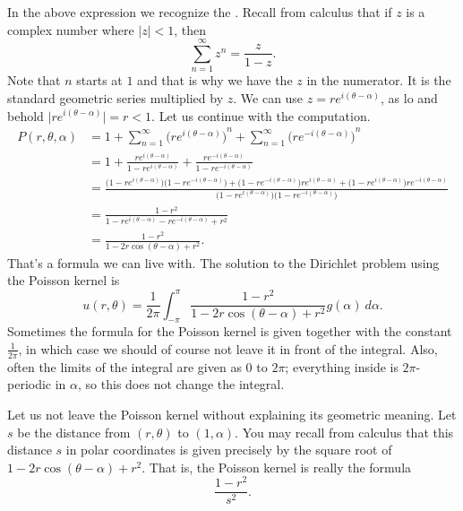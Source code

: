In the above expression we recognize the
\emph{}.
Recall from calculus that if $z$ is a complex number where $\lvert z \rvert < 1$, then
\begin{equation*}
\sum_{n=1}^\infty z^n = \frac{z}{1-z} .
\end{equation*}
Note that $n$ starts at $1$ and that is why we have the $z$ in the numerator.
It is the standard geometric series multiplied by $z$.
We can use $z = re^{i(\theta-\alpha)}$, as
lo and behold $\lvert re^{i(\theta-\alpha)} \rvert = r < 1$.
Let us
continue with the computation.
\begin{equation*}
\begin{split}
P(r,\theta,\alpha)
& =
1
+
\sum_{n=1}^\infty
{\bigl(
re^{i(\theta-\alpha)}\bigr)}^{n}
+
\sum_{n=1}^\infty
{\bigl(
re^{-i(\theta-\alpha)}\bigr)}^{n}
\\
& =
1
+
\frac{re^{i(\theta-\alpha)}}{1-re^{i(\theta-\alpha)}}
+
\frac{re^{-i(\theta-\alpha)}}{1-re^{-i(\theta-\alpha)}}
\\
& = 
\frac{
\bigl(1-re^{i(\theta-\alpha)}\bigr)\bigl(1-re^{-i(\theta-\alpha)}\bigr)
+
\bigl(1-re^{-i(\theta-\alpha)}\bigr)re^{i(\theta-\alpha)} +
\bigl(1-re^{i(\theta-\alpha)}\bigr)re^{-i(\theta-\alpha)}}
{\bigl(1-re^{i(\theta-\alpha)}\bigr)\bigl(1-re^{-i(\theta-\alpha)}\bigr)}
\\
& = 
\frac{1 -r^2}{1 - re^{i(\theta-\alpha)} - re^{-i(\theta-\alpha)} +r^2}
\\
& = 
\frac{1 -r^2}{1 - 2r\cos(\theta-\alpha) +r^2} .
\end{split}
\end{equation*}
That's a formula we can live with.  The
solution to the Dirichlet problem using the Poisson kernel is
\begin{equation*}
\boxed{~~
u(r,\theta) = 
\frac{1}{2\pi} \int_{-\pi}^{\pi}
\frac{1 -r^2}{1 - 2r\cos(\theta-\alpha) +r^2} g(\alpha) ~ d\alpha .
~~}
\end{equation*}
Sometimes the formula for the Poisson kernel is
given together with the constant $\frac{1}{2\pi}$, in which case we should
of course not leave it in front of the integral.
Also, often the limits
of the integral are given as 0 to $2\pi$; everything inside is
$2\pi$-periodic in $\alpha$, so this does not change the integral.

\begin{mywrapfigsimp}{2.1in}{2.4in}
\diffypdfversion{\vspace*{5pt}}
\noindent
{}
\end{mywrapfigsimp}
Let us not leave the Poisson kernel without explaining its geometric
meaning.  Let $s$ be the distance from $(r,\theta)$ to
$(1,\alpha)$.
You may recall from calculus that
this distance $s$ in polar coordinates is given precisely by the square root
of $1 - 2r\cos(\theta-\alpha) +r^2$.  That is, the Poisson kernel is really
the formula
\begin{equation*}
\frac{1-r^2}{s^2} .
\end{equation*}

